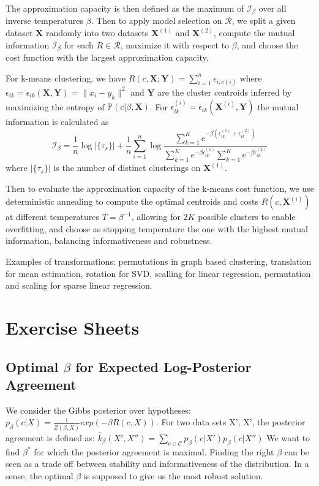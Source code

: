 \documentclass[9pt,parskip]{scrartcl}
\begin{document}
\begin{multicols*}{4}
The approximation capacity is then defined as the maximum of $\mathcal{I}_\beta$ over all inverse temperatures $\beta$. Then to apply model selection on $\mathcal{R}$, we split a given dataset $\mathbf{X}$ randomly into two datasets $\mathbf{X}^{(1)}$ and $\mathbf{X}^{(2)}$, compute the mutual information $\mathcal{I}_\beta$ for each $R \in \mathcal{R}$, maximize it with respect to $\beta$, and choose the cost function with the largest approximation capacity.

For k-means clustering, we have $R(c, \mathbf{X}; \mathbf{Y}) = \sum_{i=1}^n \epsilon_{i,c(i)}$ where $\epsilon_{ik} = \epsilon_{ik}(\mathbf{X}, \mathbf{Y}) = \|x_i - y_k\|^2$ and $\mathbf{Y}$ are the cluster centroids inferred by maximizing the entropy of $\mathbb{P}(c|\beta, \mathbf{X})$. For $\epsilon^{(i)}_{ik} = \epsilon_{ik}(\mathbf{X}^{(i)}, \mathbf{Y})$ the mutual information is calculated as
$$\mathcal{I}_\beta = \frac{1}{n} \log |\{\tau_s\}| + \frac{1}{n} \sum_{i=1}^n \log \frac{\sum_{k=1}^K e^{-\beta(\epsilon^{(1)}_{ik}+\epsilon^{(2)}_{ik})}}{\sum_{k=1}^K e^{-\beta\epsilon^{(1)}_{ik}} \sum_{k=1}^K e^{-\beta\epsilon^{(2)}_{ik}}}$$
where $|\{\tau_s\}|$ is the number of distinct clusterings on $\mathbf{X}^{(1)}$. 

Then to evaluate the approximation capacity of the k-means cost function, we use deterministic annealing to compute the optimal centroids and costs $R(c, \mathbf{X}^{(i)})$ at different temperatures $T = \beta^{-1}$, allowing for $2K$ possible clusters to enable overfitting, and choose as stopping temperature the one with the highest mutual information, balancing informativeness and robustness.

Examples of transformations: permutations in graph based clustering, translation for mean estimation, rotation for SVD, scalling for linear regression, permutation and scaling for sparse linear regression. 

\section*{Exercise Sheets}
\subsection*{Optimal $\beta$ for Expected Log-Posterior Agreement}

We consider the Gibbs posterior over hypotheses:
$p_{\beta}(c|X) = \frac{1}{Z(\beta, X)}exp(-\beta R(c,X))$.
For two data sets X', X', the posterior agreement is defined as: 
$\hat k_{\beta}(X',X'') = \sum_{c \in \mathcal{C}}p_{\beta}(c|X')p_{\beta}(c|X'')$
We want to find $\beta^*$ for which the posterior agreement is maximal. Finding the right $\beta$ can be seen as a trade off between stability and informativeness of the distribution. 
In a sense, the optimal $\beta$ is supposed to give us the most robust solution.
\end{multicols*}
\end{document}
